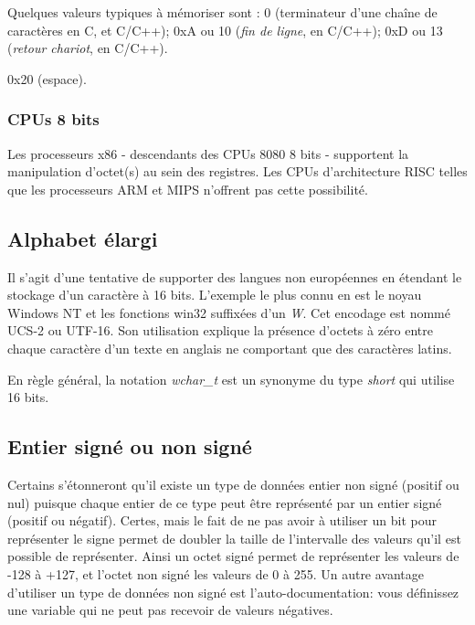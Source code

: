 Quelques valeurs typiques à mémoriser sont :
0 (terminateur d'une chaîne de caractères en C,  et C/C++);
0xA ou 10 (\emph{fin de ligne},  en C/C++);
0xD ou 13 (\emph{retour chariot},  en C/C++).

0x20 (espace).

\subsubsection{CPUs 8 bits}

Les processeurs x86 - descendants des CPUs 8080 8 bits - supportent la manipulation d'octet(s) au sein des registres.
Les CPUs d'architecture RISC telles que les processeurs ARM et MIPS n'offrent pas cette possibilité.

\subsection{Alphabet élargi}

Il s'agit d'une tentative de supporter des langues non européennes en étendant le stockage d'un caractère à 16 bits.
L'exemple le plus connu en est le noyau Windows NT et les fonctions win32 suffixées d'un \emph{W}.
Cet encodage est nommé UCS-2 ou UTF-16.
Son utilisation explique la présence d'octets à zéro entre chaque caractère d'un texte en anglais ne comportant que des caractères latins.

En règle général, la notation \emph{wchar\_t} est un synonyme du type \emph{short} qui utilise 16 bits.

\subsection{Entier signé ou non signé}

Certains s'étonneront qu'il existe un type de données entier non signé (positif ou nul) puisque chaque entier de ce type peut être représenté par un entier signé (positif ou négatif).
Certes, mais le fait de ne pas avoir à utiliser un bit pour représenter le signe permet de doubler la taille de l'intervalle des valeurs qu'il est possible de représenter.
Ainsi un octet signé permet de représenter les valeurs de -128 à +127, et l'octet non signé les valeurs de 0 à 255.
Un autre avantage d'utiliser un type de données non signé est l'auto-documentation:
vous définissez une variable qui ne peut pas recevoir de valeurs négatives.

